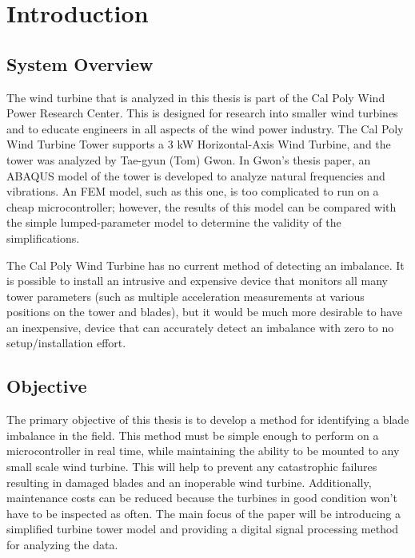 \chapter{Introduction} %

\label{ch_introduction} %

\section{System Overview}

The wind turbine that is analyzed in this thesis is part of the Cal Poly Wind Power Research Center.  This is designed for research into smaller wind turbines and to educate engineers in all aspects of the wind power industry.  The Cal Poly Wind Turbine Tower supports a 3 kW Horizontal-Axis Wind Turbine, and the tower was analyzed by Tae-gyun (Tom) Gwon\cite{Gwon_paper}.  In Gwon’s thesis paper, an ABAQUS model of the tower is developed to analyze natural frequencies and vibrations.  An FEM model, such as this one, is too complicated to run on a cheap microcontroller; however, the results of this model can be compared with the simple lumped-parameter model to determine the validity of the simplifications.

The Cal Poly Wind Turbine has no current method of detecting an imbalance.  It is possible to install an intrusive and expensive device that monitors all many tower parameters (such as multiple acceleration measurements at various positions on the tower and blades), but it would be much more desirable to have an inexpensive, device that can accurately detect an imbalance with zero to no setup/installation effort.


\section{Objective}

The primary objective of this thesis is to develop a method for identifying a blade imbalance in the field.  This method must be simple enough to perform on a microcontroller in real time, while maintaining the ability to be mounted to any small scale wind turbine.   This will help to prevent any catastrophic failures resulting in damaged blades and an inoperable wind turbine.  Additionally, maintenance costs can be reduced because the turbines in good condition won't have to be inspected as often.  The main focus of the paper will be introducing a simplified turbine tower model and providing a digital signal processing method for analyzing the data.

